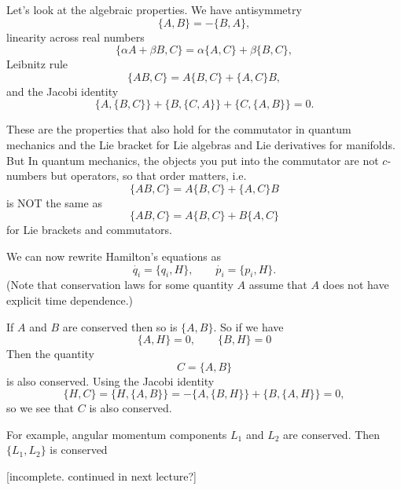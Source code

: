 \documentclass[12pt]{article} %
\begin{document}
Let's look at the algebraic properties. We have antisymmetry
\begin{equation}
\{A, B\} = - \{B, A\},
\end{equation}
linearity across real numbers
\begin{equation}
\{\alpha A + \beta B, C\} = \alpha\{ A, C\} + \beta\{B, C\},
\end{equation}
Leibnitz rule
\begin{equation}
\{AB, C\} = A\{B, C\} + \{ A, C\} B,
\end{equation}
and the Jacobi identity
\begin{equation}
\{A, \{B, C\}\} + \{B, \{C, A\}\} + \{C, \{A, B\}\} = 0.
\end{equation}

These are the properties that also hold for the commutator in quantum mechanics and the Lie bracket for Lie algebras and Lie derivatives for manifolds. But In quantum mechanics, the objects you put into the commutator are not $c$-numbers but operators, so that order matters, i.e.
\begin{equation}
\{AB, C\} = A\{B, C\}+ \{A, C\} B
\end{equation}
is NOT the same as
\begin{equation}
\{AB, C\} = A\{B, C\}+ B\{A, C\} 
\end{equation}
for Lie brackets and commutators. 

We can now rewrite Hamilton's equations as
\begin{equation}
\dot{q_i} = \{q_i, H\}, \qquad 
\dot{p_i} = \{ p_i, H\}.
\end{equation}
(Note that conservation laws for some quantity $A$ assume that $A$ does not have explicit time dependence.)

If $A$ and $B$ are conserved then so is $\{A, B\}$. So if we have
\begin{equation}
\{A, H\} = 0, \qquad 
\{B, H\} = 0
\end{equation}
Then the quantity
\begin{equation}
C = \{A, B\}
\end{equation}
is also conserved. Using the Jacobi identity
\begin{equation}
\{H, C\} = \{H, \{A, B\}\} = -\{A, \{B, H\}\} + \{B, \{A, H\}\} = 0,
\end{equation}
so we see that $C$ is also conserved.

For example, angular momentum components $L_1$ and $L_2$ are conserved. Then $\{L_1, L_2\}$ is conserved

[incomplete. continued in next lecture?]
\end{document}
